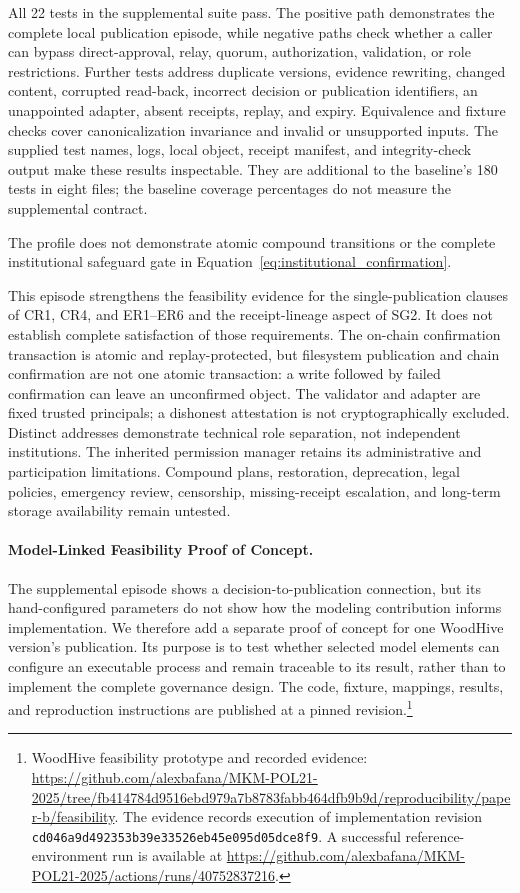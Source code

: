 \documentclass[journal]{IEEEtran}
\begin{document}
All 22 tests in the supplemental suite pass. The positive path demonstrates
the complete local publication episode, while negative paths check whether
a caller can bypass direct-approval, relay, quorum, authorization, validation,
or role restrictions. Further tests address duplicate versions, evidence
rewriting, changed content, corrupted read-back, incorrect decision or
publication identifiers, an unappointed adapter, absent receipts, replay,
and expiry. Equivalence and fixture checks cover canonicalization invariance
and invalid or unsupported inputs. The supplied test names, logs, local
object, receipt manifest, and integrity-check output make these results
inspectable. They are additional to the baseline's 180 tests in eight files;
the baseline coverage percentages do not measure the supplemental contract.

The profile does not demonstrate atomic compound transitions or the complete institutional safeguard gate in Equation~\ref{eq:institutional_confirmation}.

This episode strengthens the feasibility evidence for the single-publication
clauses of CR1, CR4, and ER1--ER6 and the receipt-lineage aspect of SG2. It does
not establish complete satisfaction of those requirements. The on-chain
confirmation transaction is atomic and replay-protected, but filesystem
publication and chain confirmation are not one atomic transaction: a write
followed by failed confirmation can leave an unconfirmed object. The validator
and adapter are fixed trusted principals; a dishonest attestation is not
cryptographically excluded. Distinct addresses demonstrate technical role
separation, not independent institutions. The inherited permission manager
retains its administrative and participation limitations. Compound plans,
restoration, deprecation, legal policies, emergency review, censorship,
missing-receipt escalation, and long-term storage availability remain untested.

\paragraph{Model-Linked Feasibility Proof of Concept.}

The supplemental episode shows a decision-to-publication connection, but
its hand-configured parameters do not show how the modeling contribution
informs implementation. We therefore add a separate proof of concept for
one WoodHive version's publication. Its purpose is to test whether selected
model elements can configure an executable process and remain traceable
to its result, rather than to implement the complete governance design.
The code, fixture, mappings, results, and reproduction instructions are
published at a pinned revision.\footnote{WoodHive feasibility prototype
and recorded evidence:
\url{https://github.com/alexbafana/MKM-POL21-2025/tree/fb414784d9516ebd979a7b8783fabb464dfb9b9d/reproducibility/paper-b/feasibility}.
The evidence records execution of implementation revision
\texttt{cd046a9d492353b39e33526eb45e095d05dce8f9}.
A successful reference-environment run is available at
\url{https://github.com/alexbafana/MKM-POL21-2025/actions/runs/40752837216}.}
\end{document}
